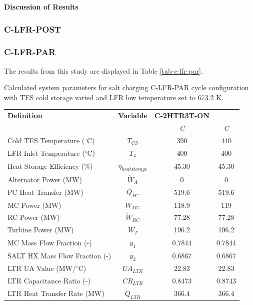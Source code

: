 \begin{paracol}{2}
\textbf{Discussion of Results}


\subsubsection{C-LFR-POST}


\subsubsection{C-LFR-PAR}

The results from this study are displayed in Table \ref{tab-c-lfr-par}.

\begin{specialtable}[H]
    \caption{Calculated system parameters for salt charging C-LFR-PAR cycle configuration with TES cold storage varied and LFR low temperature set to 673.2 K.\label{tab-c-lfr-par}}
    \begin{tabular}{lccc}
    \toprule
    \textbf{Definition} & \textbf{Variable} & \textbf{C-2HTR3T-ON} & \\
    & & \textit{C} & \textit{C}\\
    \midrule	
    Cold TES Temperature ($^{\circ}$C)	&	$T_{CS}$	&	390	&	440	\\
    LFR Inlet Temperature ($^{\circ}$C)	&	$T_{4}$	&	400	&	400	\\
    Heat Storage Efficiency (\%)	&	$\eta_{heatstorage}$	&	45.30	&	45.30	\\
    Alternator Power (MW)	&	$\dot{W}_{A}$	&	0	&	0	\\
    PC Heat Transfer (MW)	&	$\dot{Q}_{PC}$	&	519.6	&	519.6	\\
    MC Power (MW)	&	$\dot{W}_{MC}$	&	118.9	&	119	\\
    RC Power (MW)	&	$\dot{W}_{RC}$	&	77.28	&	77.28	\\
    Turbine Power (MW)	&	$\dot{W}_{T}$	&	196.2	&	196.2	\\
    MC Mass Flow Fraction (-)	&	$y_{1}$	&	0.7844	&	0.7844	\\
    SALT HX Mass Flow Fraction (-)	&	$y_{2}$	&	0.6867	&	0.6867	\\
    LTR UA Value (MW/$^{\circ}$C)	&	$UA_{LTR}$	&	22.83	&	22.83	\\
    LTR Capacitance Ratio (-)	&	$CR_{LTR}$	&	0.8473	&	0.8743	\\
    LTR Heat Transfer Rate (MW)	&	$\dot{Q}_{LTR}$	&	366.4	&	366.4	\\

\end{tabular}
\end{specialtable}
\end{paracol}
